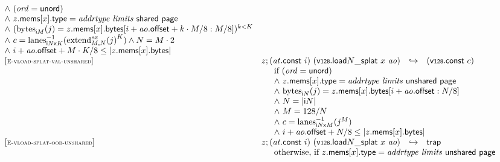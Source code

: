 $$\begin{array}[t]{@{}lrcl@{}l@{}}
{\begin{array}[t]{@{}l@{}}
{\land}~ ({\mathit{ord}} = \mathsf{unord}) \\
{\land}~ z{.}\mathsf{mems}{}[x]{.}\mathsf{type} = {\mathit{addrtype}}~{\mathit{limits}}~\mathsf{shared}~\mathsf{page} \\
{\land}~ ({{\mathrm{bytes}}}_{{\mathsf{i}}{M}}(j) = z{.}\mathsf{mems}{}[x]{.}\mathsf{bytes}{}[i + {\mathit{ao}}{.}\mathsf{offset} + k \cdot M / 8 : M / 8])^{k<K} \\
{\land}~ c = {{{{\mathrm{lanes}}}_{{{\mathsf{i}}{N}}{\mathsf{x}}{K}}^{{-1}}}}{({{{{{\mathrm{extend}}}_{M, N}^{{\mathit{sx}}}}}{(j)}^{K}})} \land N = M \cdot 2 \\
{\land}~ i + {\mathit{ao}}{.}\mathsf{offset} + M \cdot K / 8 \leq {|z{.}\mathsf{mems}{}[x]{.}\mathsf{bytes}|} \\
\end{array}
} \\
{[\textsc{\scriptsize E{-}vload{-}splat{-}val{-}unshared}]} \quad & z ; ({\mathit{at}}{.}\mathsf{const}~i)~({\mathsf{v{\scriptstyle 128}}{.}\mathsf{load}}{{N}{\mathsf{\_}}{\mathsf{splat}}}~x~{\mathit{ao}}) & \hookrightarrow & (\mathsf{v{\scriptstyle 128}}{.}\mathsf{const}~c) &  \\
& \multicolumn{4}{@{}l@{}}{\quad
\quad
\begin{array}[t]{@{}l@{}}
\mbox{if}~ ({\mathit{ord}} = \mathsf{unord}) \\
{\land}~ z{.}\mathsf{mems}{}[x]{.}\mathsf{type} = {\mathit{addrtype}}~{\mathit{limits}}~\mathsf{unshared}~\mathsf{page} \\
{\land}~ {{\mathrm{bytes}}}_{{\mathsf{i}}{N}}(j) = z{.}\mathsf{mems}{}[x]{.}\mathsf{bytes}{}[i + {\mathit{ao}}{.}\mathsf{offset} : N / 8] \\
{\land}~ N = {|{\mathsf{i}}{N}|} \\
{\land}~ M = 128 / N \\
{\land}~ c = {{{{\mathrm{lanes}}}_{{{\mathsf{i}}{N}}{\mathsf{x}}{M}}^{{-1}}}}{({j^{M}})} \\
{\land}~ i + {\mathit{ao}}{.}\mathsf{offset} + N / 8 \leq {|z{.}\mathsf{mems}{}[x]{.}\mathsf{bytes}|} \\
\end{array}
} \\
{[\textsc{\scriptsize E{-}vload{-}splat{-}oob{-}unshared}]} \quad & z ; ({\mathit{at}}{.}\mathsf{const}~i)~({\mathsf{v{\scriptstyle 128}}{.}\mathsf{load}}{{N}{\mathsf{\_}}{\mathsf{splat}}}~x~{\mathit{ao}}) & \hookrightarrow & \mathsf{trap} &  \\
& \multicolumn{4}{@{}l@{}}{\quad
\quad \mbox{otherwise, if}~ z{.}\mathsf{mems}{}[x]{.}\mathsf{type} = {\mathit{addrtype}}~{\mathit{limits}}~\mathsf{unshared}~\mathsf{page}
}
\end{array}$$
